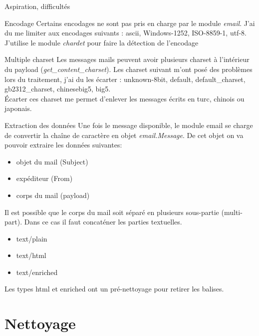 \documentclass[xelatex,11pt, xcolor=dvipsnames]{beamer}
\begin{document}
\begin{frame}{Aspiration, difficultés} 
	\begin{block}{Encodage}
	Certains encodages ne sont pas pris en charge par le module \emph{email}. J'ai du me limiter aux encodages suivants : ascii, Windows-1252, ISO-8859-1, utf-8.\\
	J'utilise le module \emph{chardet} pour faire la détection de l'encodage
	\end{block}
	
	\begin{block}{Multiple charset}
	Les messages mails peuvent avoir plusieurs charset à l'intérieur du payload (\emph{get\_content\_charset}). Les charset suivant m'ont posé des problèmes lors du traitement, j'ai du les écarter : unknown-8bit, default, default\_charset, gb2312\_charset, chinesebig5, big5.\\
	Écarter ces charset me permet d'enlever les messages écrits en turc, chinois ou japonais. 
	\end{block}
	
\end{frame}

\begin{frame}{Extraction des données}
	Une fois le message disponible, le module email se charge de convertir la chaîne de caractère en objet \emph{email.Message}. De cet objet on va pouvoir extraire les données suivantes:
	\begin{itemize}
		\item objet du mail (Subject)
		\item expéditeur (From)
		\item corps du mail (payload)
	\end{itemize}
	Il est possible que le corps du mail soit séparé en plusieurs sous-partie (multi-part).
	Dans ce cas il faut concaténer les parties textuelles. 
	\begin{itemize}
		\item text/plain
		\item text/html
		\item text/enriched
	\end{itemize}
	Les types html et enriched ont un pré-nettoyage pour retirer les balises. 
\end{frame}

\section{Nettoyage}
\end{document}
